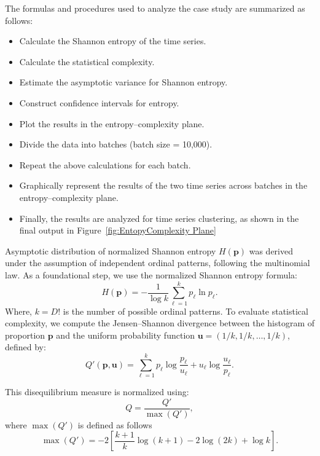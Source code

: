 The formulas and procedures used to analyze the case study are summarized as follows:
\begin{itemize}
	\item Calculate the Shannon entropy of the time series.
	\item Calculate the statistical complexity.
	\item Estimate the asymptotic variance for Shannon entropy.
	\item Construct confidence intervals for entropy.
	\item Plot the results in the entropy–complexity plane.
	\item Divide the data into batches (batch size = 10,000).
	\item Repeat the above calculations for each batch.
	\item Graphically represent the results of the two time series across batches in the entropy–complexity plane.
	\item Finally, the results are analyzed for time series clustering, as shown in the final output in Figure~\ref{fig:EntopyComplexity Plane}
\end{itemize}


Asymptotic distribution of normalized Shannon entropy $H(\mathbf{p})$ was derived under the assumption of independent ordinal patterns, following the multinomial law. As a foundational step, we use the normalized Shannon entropy formula: 
\begin{equation}
	H(\mathbf{p})=-\dfrac{1}{\log k}\sum^{k}_{\ell=1}p_{\ell} \ln{p_{\ell}}.
\end{equation}
Where, $k=D!$ is the number of possible ordinal patterns. To evaluate statistical complexity, we compute the Jensen–Shannon divergence between the histogram of proportion $\mathbf{p}$ and the uniform probability function $\mathbf{u}=(1/k, 1/k, \dots, 1/k)$, defined by:  
\begin{equation}
	Q'(\mathbf{p,u})=\sum^k_{\ell=1} p_\ell\log\dfrac{p_\ell}{u_\ell}+u_\ell\log\dfrac{u_\ell}{p_\ell}.
\end{equation}

This disequilibrium measure is normalized using:
\begin{equation}
	Q=\dfrac{Q'}{\max{(Q')}},
\end{equation}
where $\max(Q')$ is defined as follows
\begin{equation}
	\max(Q')=-2 \left[\dfrac{k+1}{k}\log(k+1)-2\log(2k)+\log k\right].
\end{equation}

